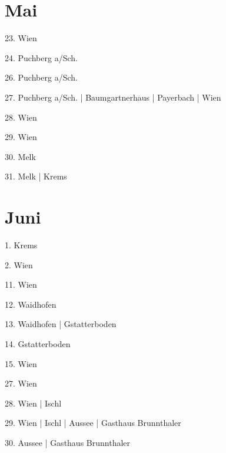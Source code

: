 \documentclass[twoside=false,titlepage=false,open=any, parskip=never, fontsize=10pt, headings=small, chapterprefix=false, appendixprefix=false, DIV=15]{scrbook}
\begin{document}
\begin{multicols}{3}
            \section*{Mai}
            23. Wien\par
            24. Puchberg a/Sch.\par
            26. Puchberg a/Sch.\par
            27. Puchberg a/Sch. | Baumgartnerhaus | Payerbach | Wien\par
            28. Wien\par
            29. Wien\par
            30. Melk\par
            31. Melk | Krems\par
            \section*{Juni}
            1. Krems\par
            2. Wien\par
            11. Wien\par
            12. Waidhofen\par
            13. Waidhofen | Gstatterboden\par
            14. Gstatterboden\par
            15. Wien\par
            27. Wien\par
            28. Wien | Ischl\par
            29. Wien | Ischl | Aussee | Gasthaus Brunnthaler\par
            30. Aussee | Gasthaus Brunnthaler\par

\end{multicols}
\end{document}

